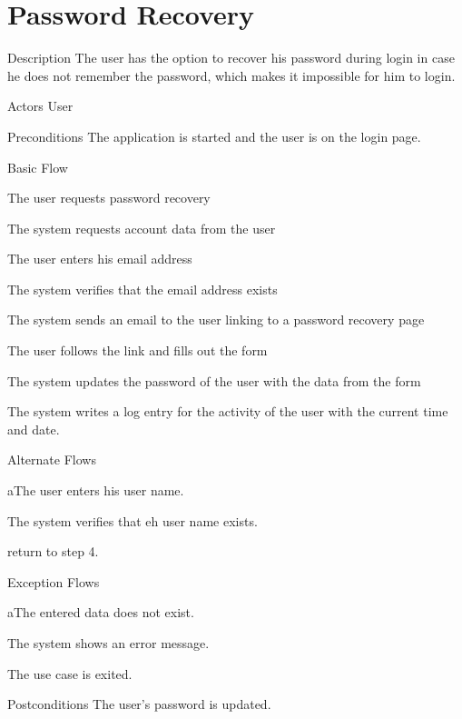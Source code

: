 \section{Password Recovery}

%
\begin{cpart}{Description}
The user has the option to recover his password during login in case he does not remember the password, which makes it impossible for him to login.
\end{cpart}


%
\begin{cpart}{Actors}
User
\end{cpart}

%
\begin{cpart}{Preconditions}
The application is started and the user is on the login page.
\end{cpart}

%
\begin{cpartList}{Basic Flow}
  \item The user requests password recovery
  \item The system requests account data from the user
  \item The user enters his email address
  \item The system verifies that the email address exists
  \item The system sends an email to the user linking to a password recovery page
  \item The user follows the link and fills out the form
  \item The system updates the password of the user with the data from the form
  \item The system writes a log entry for the activity of the user with the current time and date.
\end{cpartList}

%
\begin{cpartList}{Alternate Flows}
  \begin{innerList}{3}{a}{The user enters his user name.}
    \item The system verifies that eh user name exists.
    \item return to step 4.
  \end{innerList}
\end{cpartList}

%
\begin{cpartList}{Exception Flows}
  \begin{innerList}{4}{a}{The entered data does not exist.}
    \item The system shows an error message.
    \item The use case is exited.
  \end{innerList}
\end{cpartList}

%
\begin{cpart}{Postconditions}
The user's password is updated.
\end{cpart}

\clearpage
